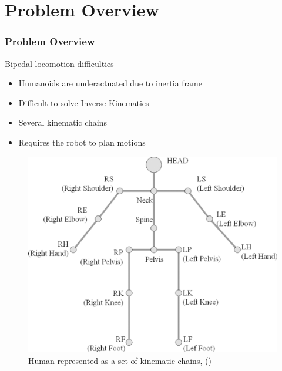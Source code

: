 \documentclass{beamer}
\begin{document}
	\section*{Problem Overview}
		\begin{frame}
			\frametitle{Problem Overview}
			\begin{block}{Bipedal locomotion difficulties}
				\begin{itemize}
					\item
						Humanoids are underactuated due to inertia frame
					\item
						Difficult to solve Inverse Kinematics
					\item
						Several kinematic chains
					\item 
						Requires the robot to plan motions
				\end{itemize}
			\end{block}
			
			\begin{figure}[h!]
				\begin{minipage}[H]{\linewidth}
					\centering
					\includegraphics[scale=0.5]{presentation_images/7}
					\caption{Human represented as a set of kinematic chains, (\cite{seo2011improved})}
				\end{minipage}
			\end{figure}
		\end{frame}

\end{document}
